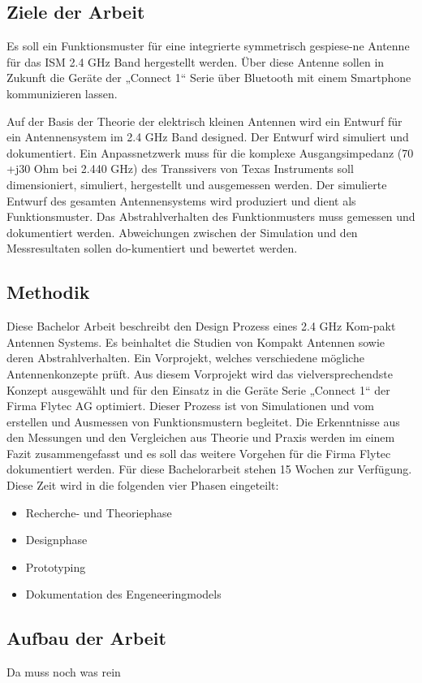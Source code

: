 \subsection{Ziele der Arbeit}
Es soll ein Funktionsmuster für eine integrierte symmetrisch gespiese-ne Antenne für das ISM 2.4 GHz Band hergestellt werden. Über diese Antenne sollen in Zukunft die Geräte der „Connect 1“ Serie über Bluetooth mit einem Smartphone kommunizieren lassen. 

Auf der Basis der Theorie der elektrisch kleinen Antennen wird ein Entwurf für ein Antennensystem im 2.4 GHz Band designed. Der Entwurf wird simuliert und dokumentiert. 
Ein Anpassnetzwerk muss für die komplexe Ausgangsimpedanz (70 +j30 Ohm bei 2.440 GHz) des Transsivers von Texas Instruments soll dimensioniert, simuliert, hergestellt und ausgemessen werden.
Der simulierte Entwurf des gesamten Antennensystems wird produziert und dient als Funktionsmuster. Das Abstrahlverhalten des Funktionmusters muss gemessen und dokumentiert werden.
Abweichungen zwischen der Simulation und den Messresultaten sollen do-kumentiert und bewertet werden.
\subsection{Methodik}
Diese Bachelor Arbeit beschreibt den Design Prozess eines 2.4 GHz Kom-pakt Antennen Systems. Es beinhaltet die Studien von Kompakt Antennen sowie deren Abstrahlverhalten. Ein Vorprojekt, welches verschiedene mögliche Antennenkonzepte prüft. Aus diesem Vorprojekt wird das vielversprechendste Konzept ausgewählt und für den Einsatz in die Geräte Serie „Connect 1“ der Firma Flytec AG optimiert. Dieser Prozess ist von Simulationen und vom erstellen und Ausmessen von Funktionsmustern begleitet. Die Erkenntnisse aus den Messungen und den Vergleichen aus Theorie und Praxis werden im einem Fazit zusammengefasst und es soll das weitere Vorgehen für die Firma Flytec dokumentiert werden. Für diese Bachelorarbeit stehen 15 Wochen zur Verfügung. Diese Zeit wird in die folgenden vier Phasen eingeteilt:
\begin{itemize}
	\item Recherche- und Theoriephase
	\item Designphase
	\item Prototyping 
	\item Dokumentation des Engeneeringmodels
\end{itemize}

\subsection{Aufbau der Arbeit}
Da muss noch was rein



